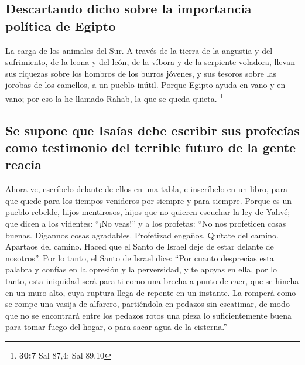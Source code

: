 \hypertarget{descartando-dicho-sobre-la-importancia-poluxedtica-de-egipto}{%
\subsection{Descartando dicho sobre la importancia política de
Egipto}\label{descartando-dicho-sobre-la-importancia-poluxedtica-de-egipto}}

 La carga de los animales del Sur. A través de la tierra
de la angustia y del sufrimiento, de la leona y del león, de la víbora y
de la serpiente voladora, llevan sus riquezas sobre los hombros de los
burros jóvenes, y sus tesoros sobre las jorobas de los camellos, a un
pueblo inútil.  Porque Egipto ayuda en vano y en vano; por
eso la he llamado Rahab, la que se queda quieta. \footnote{\textbf{30:7}
  Sal 87,4; Sal 89,10}

\hypertarget{se-supone-que-isauxedas-debe-escribir-sus-profecuxedas-como-testimonio-del-terrible-futuro-de-la-gente-reacia}{%
\subsection{Se supone que Isaías debe escribir sus profecías como
testimonio del terrible futuro de la gente
reacia}\label{se-supone-que-isauxedas-debe-escribir-sus-profecuxedas-como-testimonio-del-terrible-futuro-de-la-gente-reacia}}

 Ahora ve, escríbelo delante de ellos en una tabla, e
inscríbelo en un libro, para que quede para los tiempos venideros por
siempre y para siempre.  Porque es un pueblo rebelde,
hijos mentirosos, hijos que no quieren escuchar la ley de Yahvé;
 que dicen a los videntes: ``¡No veas!'' y a los
profetas: ``No nos profeticen cosas buenas. Dígannos cosas agradables.
Profetizad engaños.  Quítate del camino. Apartaos del
camino. Haced que el Santo de Israel deje de estar delante de
nosotros''.  Por lo tanto, el Santo de Israel dice: ``Por
cuanto desprecias esta palabra y confías en la opresión y la
perversidad, y te apoyas en ella,  por lo tanto, esta
iniquidad será para ti como una brecha a punto de caer, que se hincha en
un muro alto, cuya ruptura llega de repente en un instante.
 La romperá como se rompe una vasija de alfarero,
partiéndola en pedazos sin escatimar, de modo que no se encontrará entre
los pedazos rotos una pieza lo suficientemente buena para tomar fuego
del hogar, o para sacar agua de la cisterna.''

